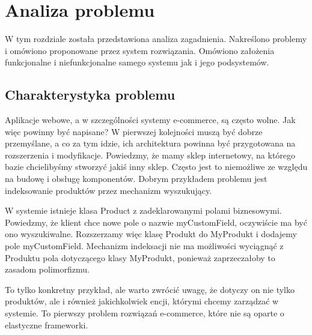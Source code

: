 \chapter{Analiza problemu}
\thispagestyle{chapterBeginStyle}
\label{rozdzial1}

W tym rozdziale została przedstawiona analiza zagadnienia. Nakreślono problemy i omówiono proponowane przez system rozwiązania. Omówiono założenia funkcjonalne i niefunkcjonalne samego systemu jak i jego podsystemów.


\section{Charakterystyka problemu}
Aplikacje webowe, a w szczególności systemy e-commerce, są często wolne. Jak więc powinny być napisane? W pierwszej kolejności muszą być dobrze przemyślane, a co za tym idzie, ich architektura powinna być przygotowana na rozszerzenia i modyfikacje. Powiedzmy, że mamy sklep internetowy, na którego bazie chcielibyśmy stworzyć jakiś inny sklep. Często jest to niemożliwe ze względu na budowę i obsługę komponentów. Dobrym przykładem problemu jest indeksowanie produktów przez mechanizm wyszukujący.
\begin{example}
	W systemie istnieje klasa Product z zadeklarowanymi polami biznesowymi. Powiedzmy, że klient chce nowe pole o nazwie myCustomField, oczywiście ma być ono wyszukiwalne. Rozszerzamy więc klasę Produkt do MyProdukt i dodajemy pole myCustomField. Mechanizm indeksacji nie ma możliwości wyciągnąć z Produktu pola dotyczącego klasy MyProdukt, ponieważ zaprzeczałoby to zasadom polimorfizmu.
\end{example} 
To tylko konkretny przykład, ale warto zwrócić uwagę, że dotyczy on nie tylko produktów, ale i również jakichkolwiek encji, którymi chcemy zarządzać w systemie. To pierwszy problem rozwiązań e-commerce, które nie są oparte o elastyczne frameworki. 

